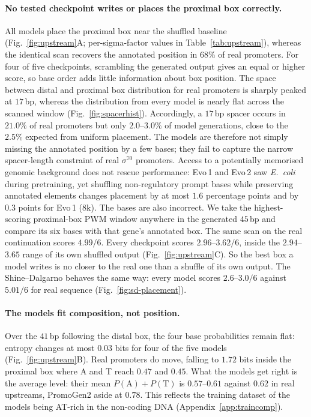 \documentclass{article}
\begin{document}
\paragraph{No tested checkpoint writes or places the proximal box correctly.}
All models place the proximal box near the shuffled baseline
(Fig.~\ref{fig:upstream}A; per-sigma-factor values in Table~\ref{tab:upstream}),
whereas the identical scan
recovers the annotated position in $68\%$ of real promoters. For four of five
checkpoints, scrambling the generated output gives an equal or higher score, so
base order adds little information about box position. The space between distal and proximal box
distribution for real promoters is sharply peaked at $17$\,bp, whereas the
distribution from every model is nearly flat across the scanned window
(Fig.~\ref{fig:spacerhist}). Accordingly, a $17$\,bp spacer occurs in $21.0\%$ of
real promoters but only $2.0$--$3.0\%$ of model generations, close to the $2.5\%$
expected from uniform placement. The models are therefore not simply missing the
annotated position by a few bases; they fail to capture the narrow spacer-length
constraint of real $\sigma^{70}$ promoters. Access to a potentially
memorised genomic background does not rescue performance: Evo\,1 and Evo\,2 saw
\emph{E.~coli} during pretraining, yet shuffling non-regulatory prompt bases while
preserving annotated elements changes placement by at most $1.6$ percentage
points and by $0.3$ points for Evo\,1 (8k). The bases are also incorrect. We take the highest-scoring
proximal-box PWM window anywhere in the generated $45$\,bp and compare its six
bases with that gene's annotated box. The same scan on the real continuation
scores $4.99/6$. Every checkpoint scores
$2.96$--$3.62/6$, inside the $2.94$--$3.65$ range of its own shuffled output
(Fig.~\ref{fig:upstream}C). So the best box a model writes is no closer to the
real one than a shuffle of its own output. The Shine--Dalgarno behaves the same
way: every model scores $2.6$--$3.0/6$ against $5.01/6$ for real sequence
(Fig.~\ref{fig:sd-placement}).


\paragraph{The models fit composition, not position.} Over the $41$\,bp following
the distal box, the four base probabilities remain flat: entropy changes at most
$0.03$ bits for four of the five models (Fig.~\ref{fig:upstream}B). Real
promoters do move, falling to $1.72$ bits inside the proximal box where A and T
reach $0.47$ and $0.45$. What the models get right is the average level: their mean
$P(\mathrm{A})+P(\mathrm{T})$ is $0.57$--$0.61$ against $0.62$ in real upstreams,
PromoGen2 aside at $0.78$. This reflects the training dataset of the models being
AT-rich in the non-coding DNA (Appendix~\ref{app:traincomp}).
\end{document}
